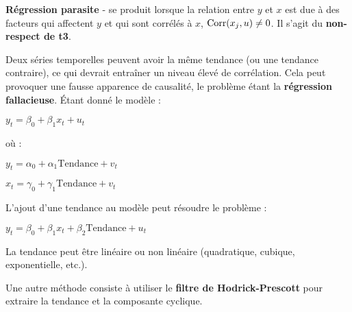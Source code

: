 \begin{f}

\textbf{Régression parasite} - se produit lorsque la relation entre \(y\) et \(x\) est due à des facteurs qui affectent \(y\) et qui sont corrélés à \(x\), \(\mathrm{Corr}(x_{j}, u) \neq 0\). Il s'agit du \textbf {non-respect de t3}.



Deux séries temporelles peuvent avoir la même tendance (ou une tendance contraire), ce qui devrait entraîner un niveau élevé de corrélation. Cela peut provoquer une fausse apparence de causalité, le problème étant la \textbf{régression fallacieuse}. Étant donné le modèle :
%
\begin{center}
	\(y_{t} = \beta_{0} + \beta_{1} x_{t} + u_{t}\)
\end{center}
où :
\begin{center}
	\(y_{t} = \alpha_{0} + \alpha_{1} \mathrm{Tendance} + v_{t}\)
	
	\(x_{t} = \gamma_{0} + \gamma_{1} \mathrm{Tendance} + v_{t}\)
\end{center}
L'ajout d'une tendance au modèle peut résoudre le problème :
\begin{center}
	\(y_{t} = \beta_{0} + \beta_{1} x_{t} + \beta_{2} \mathrm{Tendance} + u_{t}\)
\end{center}
La tendance peut être linéaire ou non linéaire (quadratique, cubique, exponentielle, etc.).

Une autre méthode consiste à utiliser le \textbf{filtre de Hodrick-Prescott} pour extraire la tendance et la composante cyclique.

\end{f}    

